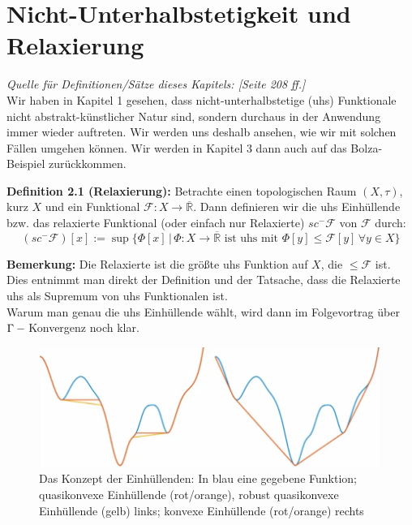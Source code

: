 \chapter{Nicht-Unterhalbstetigkeit und Relaxierung}
\textit{Quelle für Definitionen/Sätze dieses Kapitels: \cite{CalcVarJost}[Seite 208 ff.]}\\[0.1cm]
Wir haben in Kapitel 1 gesehen, dass nicht-unterhalbstetige (uhs) Funktionale nicht abstrakt-künstlicher Natur sind, sondern durchaus in der Anwendung immer wieder auftreten. Wir werden uns deshalb ansehen, wie wir mit solchen Fällen umgehen können. Wir werden in Kapitel 3 dann auch auf das Bolza-Beispiel zurückkommen.\\

\colorbox{defblue}{\begin{minipage}{16cm}{\textcolor{black}{}{\label{def2.1}}}
\textbf{Definition 2.1 (Relaxierung):} Betrachte einen topologischen Raum \((X,\tau)\), kurz \(X\) und ein Funktional \(\mathcal{F}:X \to \overline{\mathbb{R}}\). Dann definieren wir die uhs Einhüllende bzw. das relaxierte Funktional (oder einfach nur Relaxierte) \(sc^- \mathcal{F}\) von \(\mathcal{F}\) durch:
\begin{equation}
    (sc^-\mathcal{F})[x] := \sup \{\Phi[x] \, | \, \Phi : X \to \overline{\mathbb{R}} \text{ ist uhs mit }\Phi[y] \le \mathcal{F}[y] \, \forall y \in X\}
\end{equation}
\end{minipage}}

\textbf{Bemerkung:} Die Relaxierte ist die größte uhs Funktion auf \(X\), die \(\le \mathcal{F}\) ist. Dies entnimmt man direkt der Definition und der Tatsache, dass die Relaxierte uhs als Supremum von uhs Funktionalen ist.\\
Warum man genau die uhs Einhüllende wählt, wird dann im Folgevortrag über \(\Gamma-\\\)Konvergenz noch klar.\\

\begin{figure}[!h]
    \centering
    \includegraphics[scale=0.8]{figures/Einhuellende.png}
    \caption{Das Konzept der Einhüllenden: In blau eine gegebene Funktion; quasikonvexe Einhüllende (rot/orange), robust quasikonvexe Einhüllende (gelb) links; konvexe Einhüllende (rot/orange) rechts \cite{ConvexEnvelope}}
    \label{fig:einh}
\end{figure}

